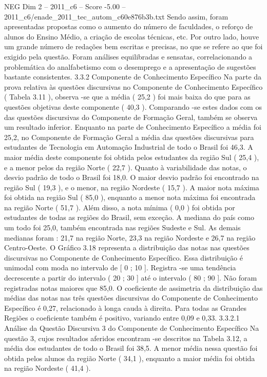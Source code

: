 \begin{textsample}{NEG Dim 2 – 2011\_c6 – Score -5.00 – 2011\_c6/enade\_2011\_tec\_autom\_c60e876b3b.txt}
Sendo assim, foram apresentadas propostas como o aumento do número de faculdades, o reforço de alunos do Ensino Médio, a criação de escolas técnicas, etc.
Por outro lado, houve um grande número de redações bem escritas e precisas, no que se refere ao que foi exigido pela questão.
Foram análises equilibradas e sensatas, correlacionando a problemática do analfabetismo com o desemprego e a apresentação de sugestões bastante consistentes. 3.3.2 Componente de Conhecimento Específico Na parte da prova relativa às questões discursivas no Componente de Conhecimento Específico ( Tabela 3.11 ), observa -se que a média ( 25,2 ) foi mais baixa do que para as questões objetivas deste componente ( 40,3 ).
Comparando -se estes dados com os das questões discursivas do Componente de Formação Geral, também se observa um resultado inferior.
Enquanto na parte de Conhecimento Específico a média foi 25,2, no Componente de Formação Geral a média das questões discursivas para estudantes de Tecnologia em Automação Industrial de todo o Brasil foi 46,3.
A maior média deste componente foi obtida pelos estudantes da região Sul ( 25,4 ), e a menor pelos da região Norte ( 22,7 ).
Quanto à variabilidade das notas, o desvio padrão de todo o Brasil foi 18,0.
O maior desvio padrão foi encontrado na região Sul ( 19,3 ), e o menor, na região Nordeste ( 15,7 ).
A maior nota máxima foi obtida na região Sul ( 85,0 ), enquanto a menor nota máxima foi encontrada na região Norte ( 51,7 ).
Além disso, a nota mínima ( 0,0 ) foi obtida por estudantes de todas as regiões do Brasil, sem exceção.
A mediana do país como um todo foi 25,0, também encontrada nas regiões Sudeste e Sul.
As demais medianas foram : 21,7 na região Norte, 23,3 na região Nordeste e 26,7 na região Centro-Oeste.
O Gráfico 3.18 representa a distribuição das notas nas questões discursivas no Componente de Conhecimento Específico.
Essa distribuição é unimodal com moda no intervalo de [ 0 ; 10 ].
Registra -se uma tendência decrescente a partir do intervalo ( 20 ; 30 ] até o intervalo ( 80 ; 90 ].
Não foram registradas notas maiores que 85,0.
O coeficiente de assimetria da distribuição das médias das notas nas três questões discursivas do Componente de Conhecimento Específico é 0,27, relacionado à longa cauda à direita.
Para todas as Grandes Regiões o coeficiente também é positivo, variando entre 0,09 e 0,33. 3.3.2.1 Análise da Questão Discursiva 3 do Componente de Conhecimento Específico Na questão 3, cujos resultados aferidos encontram -se descritos na Tabela 3.12, a média dos estudantes de todo o Brasil foi 38,5.
A menor média nessa questão foi obtida pelos alunos da região Norte ( 34,1 ), enquanto a maior média foi obtida na região Nordeste ( 41,4 ).

\end{textsample}
